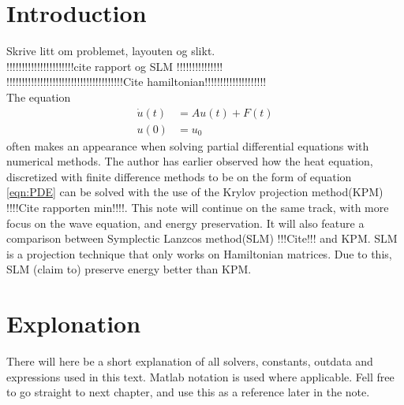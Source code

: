 \chapter{Introduction}
Skrive litt om problemet, layouten og slikt. \\
!!!!!!!!!!!!!!!!!!!!!!cite rapport og SLM !!!!!!!!!!!!!!!\\
!!!!!!!!!!!!!!!!!!!!!!!!!!!!!!!!!!!!!!Cite hamiltonian!!!!!!!!!!!!!!!!!!!!\\
The equation 
\begin{equation} 
\begin{aligned}
\dot{u}(t) &= A u(t) + F(t) \\
u(0)&= u_0
\end{aligned}
\label{eqn:PDE}
\end{equation}
often makes an appearance when solving partial differential equations with numerical methods. The author has earlier observed how the heat equation, discretized with finite difference methods to be on the form of equation \eqref{eqn:PDE} can be solved with the use of the Krylov projection method(KPM) !!!!Cite rapporten min!!!!. This note will continue on the same track, with more focus on the wave equation, and energy preservation. It will also feature a comparison between Symplectic Lanzcos method(SLM) !!!Cite!!! and KPM. SLM is a projection technique that only works on Hamiltonian matrices. Due to this, SLM (claim to) preserve energy better than KPM.  

\chapter{Explonation}
There will here be a short explanation of all solvers, constants, outdata and expressions used in this text. Matlab notation is used where applicable. Fell free to go straight to next chapter, and use this as a reference later in the note.


